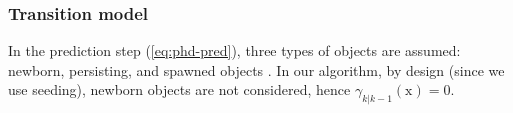 
\subsubsection{Transition model}
\label{sssec:prediction-model}
In the prediction step (\ref{eq:phd-pred}), three types of objects are assumed: newborn, persisting, and spawned objects \citep{vo2005sequential,vo2006gaussian}. In our algorithm, by design (since we use seeding), newborn objects are not considered, hence $\gamma_{k|k-1}(\mathrm{x})=0$.

